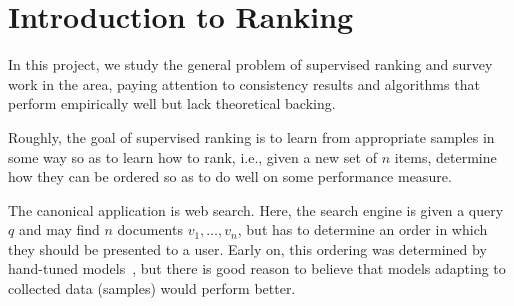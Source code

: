\section{Introduction to Ranking}
In this project, we study the general problem of supervised ranking and survey
work in the area, paying attention to consistency results and
algorithms that perform empirically well but lack theoretical backing.

Roughly, the goal of supervised ranking is to learn from appropriate samples
in some way so as to learn how to rank, i.e., given a new set of $n$ items,
determine how they can be ordered so as to do well on some performance measure.

The canonical application is web search. Here, the search engine is given
a query $q$ and may find $n$ documents $v_1, \ldots, v_n$, but
has to determine an order in which they should be presented to a user.
Early on, this ordering was determined by hand-tuned models~\cite{bm25},
but there is good reason to believe that models adapting to collected data
(samples) would perform better. 

